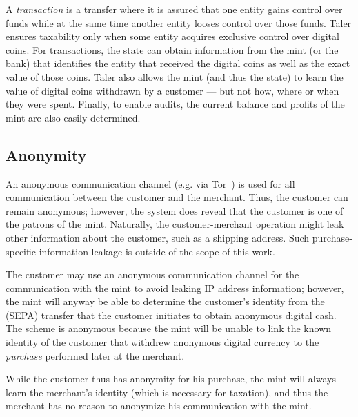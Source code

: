 \documentclass{llncs}
\begin{document}
A {\em transaction} is a transfer where it is assured that one entity
gains control over funds while at the same time another entity looses
control over those funds.  Taler ensures taxability only when some
entity acquires exclusive control over digital coins.  For
transactions, the state can obtain information from the mint (or the
bank) that identifies the entity that received the digital coins as
well as the exact value of those coins.  Taler also allows the mint
(and thus the state) to learn the value of digital coins withdrawn by
a customer --- but not how, where or when they were spent.  Finally,
to enable audits, the current balance and profits of the mint are also
easily determined.

\subsection{Anonymity}

An anonymous communication channel (e.g. via Tor~\cite{tor-design}) is
used for all communication between the customer and the merchant.
Thus, the customer can remain anonymous; however, the system does reveal
that the customer is one of the patrons of the mint.  Naturally, the
customer-merchant operation might leak other information about the
customer, such as a shipping address.  Such purchase-specific
information leakage is outside of the scope of this work.

The customer may use an anonymous communication channel for the
communication with the mint to avoid leaking IP address information;
however, the mint will anyway be able to determine the customer's
identity from the (SEPA) transfer that the customer initiates to
obtain anonymous digital cash.  The scheme is anonymous
because the mint will be unable to link the known identity of the
customer that withdrew anonymous digital currency to the {\em
  purchase} performed later at the merchant.

While the customer thus has anonymity for his purchase, the mint will
always learn the merchant's identity (which is necessary for
taxation), and thus the merchant has no reason to anonymize his
communication with the mint.
\end{document}

